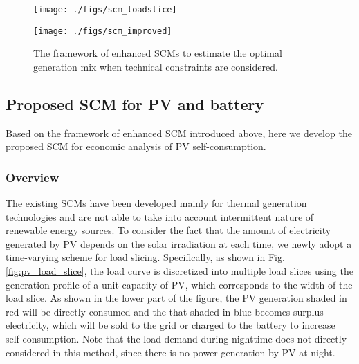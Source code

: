 \documentclass[lettersize,journal]{IEEEtran}
\newcommand{\figref}[1]{Fig.\,\ref{#1}}
\begin{document}
\begin{figure}[!t]
    \begin{minipage}[b]{\linewidth}
    	  \centering
        \texttt{[image: ./figs/scm\_loadslice]}
         \label{fig:load_slice}
    \end{minipage}
   \begin{minipage}[b]{\linewidth}
        \centering
        \texttt{[image: ./figs/scm\_improved]}
         \label{fig:enhanced_scm} 
   \end{minipage}
   \caption{The framework of enhanced SCMs to estimate the optimal generation mix when technical constraints are considered. }
\end{figure}





\subsection{Proposed SCM for PV and battery} \label{sec:scm_der}

Based on the framework of enhanced SCM introduced above, here we develop the proposed SCM for economic analysis of PV self-consumption. 

\subsubsection{Overview}

The existing SCMs have been developed mainly for thermal generation technologies and are not able to take into account intermittent nature of renewable energy sources. 
To consider the fact that the amount of electricity generated by PV depends on the solar irradiation at each time, we newly adopt a time-varying scheme for load slicing. 
Specifically, as shown in \figref{fig:pv_load_slice}, the load curve is discretized into multiple load slices using the generation profile of a unit capacity of PV, which corresponds to the width of the load slice.  
As shown in the lower part of the figure, the PV generation shaded in red will be directly consumed and the that shaded in blue becomes surplus electricity, which will be sold to the grid or charged to the battery to increase self-consumption. 
Note that the load demand during nighttime does not directly considered in this method, since there is no power generation by PV at night.  
\end{document}
